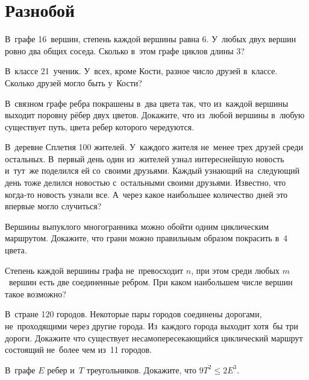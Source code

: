 
\section*{Разнобой}


\begin{problems}

\item
В~графе 16~вершин, степень каждой вершины равна 6.
У~любых двух вершин ровно два общих соседа.
Сколько в~этом графе циклов длины 3?

\item
В~классе 21~ученик.
У~всех, кроме Кости, разное число друзей в~классе.
Сколько друзей могло быть у~Кости?

\item
В~связном графе ребра покрашены в~два цвета так, что из~каждой вершины выходит
поровну рёбер двух цветов.
Докажите, что из~любой вершины в~любую существует путь, цвета ребер которого
чередуются.

\item
В~деревне Сплетня 100 жителей.
У~каждого жителя не~менее трех друзей среди остальных.
 В~первый день один из~жителей узнал интереснейшую новость и~тут~же поделился
ей со~своими друзьями.
Каждый узнающий на~следующий день тоже делился новостью с~остальными своими
друзьями.
Известно, что когда-то новость узнали все.
А~через какое наибольшее количество дней это впервые могло случиться?

\item
Вершины выпуклого многогранника можно обойти одним циклическим маршрутом.
Докажите, что грани можно правильным образом покрасить в~4 цвета.

\item
Степень каждой вершины графа не~превосходит $n$, при этом среди любых
$m$~вершин есть две соединенные ребром.
При каком наибольшем числе вершин такое возможно?

\item
В~стране 120 городов.
Некоторые пары городов соединены дорогами, не~проходящими через другие города.
Из~каждого города выходит хотя~бы три дороги.
Докажите что существует несамопересекающийся циклический маршрут состоящий
не~более чем из~11 городов.

\item
В~графе $E$ ребер и~$T$ треугольников.
Докажите, что $9 T^2 \leq 2 E^3$.

\end{problems}

